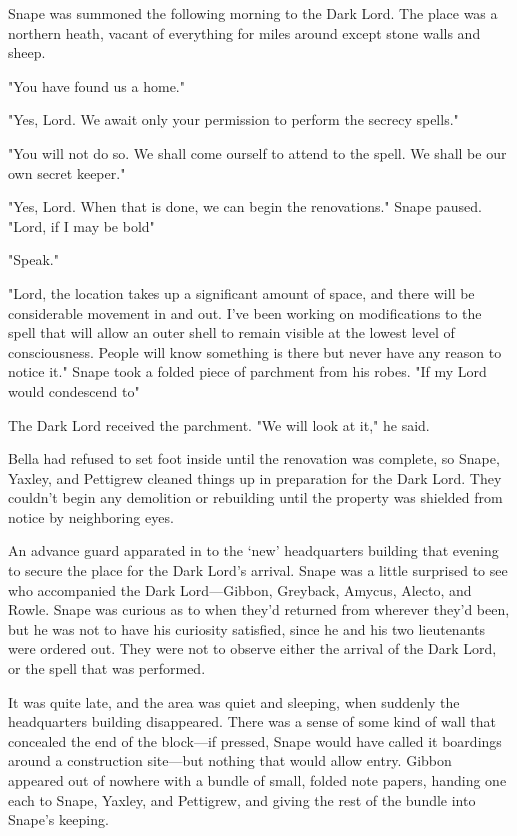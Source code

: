 Snape was summoned the following morning to the Dark Lord. The place was a northern heath, vacant of everything for miles around except stone walls and sheep.

"You have found us a home."

"Yes, Lord. We await only your permission to perform the secrecy spells."

"You will not do so. We shall come ourself to attend to the spell. We shall be our own secret keeper."

"Yes, Lord. When that is done, we can begin the renovations." Snape paused. "Lord, if I may be bold{\el}"

"Speak."

"Lord, the location takes up a significant amount of space, and there will be considerable movement in and out. I've been working on modifications to the spell that will allow an outer shell to remain visible at the lowest level of consciousness. People will know something is there but never have any reason to notice it." Snape took a folded piece of parchment from his robes. "If my Lord would condescend to{\el}"

The Dark Lord received the parchment. "We will look at it," he said.

Bella had refused to set foot inside until the renovation was complete, so Snape, Yaxley, and Pettigrew cleaned things up in preparation for the Dark Lord. They couldn't begin any demolition or rebuilding until the property was shielded from notice by neighboring eyes.

An advance guard apparated in to the `new' headquarters building that evening to secure the place for the Dark Lord's arrival. Snape was a little surprised to see who accompanied the Dark Lord—Gibbon, Greyback, Amycus, Alecto, and Rowle. Snape was curious as to when they'd returned from wherever they'd been, but he was not to have his curiosity satisfied, since he and his two lieutenants were ordered out. They were not to observe either the arrival of the Dark Lord, or the spell that was performed.

It was quite late, and the area was quiet and sleeping, when suddenly the headquarters building disappeared. There was a sense of some kind of wall that concealed the end of the block—if pressed, Snape would have called it boardings around a construction site—but nothing that would allow entry. Gibbon appeared out of nowhere with a bundle of small, folded note papers, handing one each to Snape, Yaxley, and Pettigrew, and giving the rest of the bundle into Snape's keeping.

